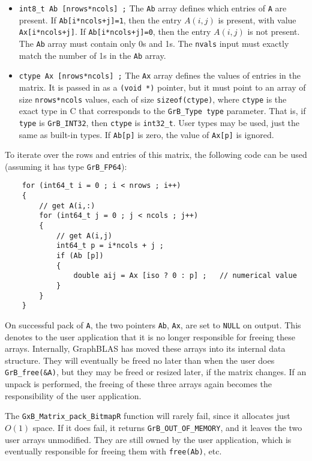 \documentclass[12pt]{article}
\begin{document}
\begin{itemize}
\item \verb'int8_t Ab [nrows*ncols] ;'  The \verb'Ab' array defines which
entries of \verb'A' are present.  If \verb'Ab[i*ncols+j]=1', then the entry
$A(i,j)$ is present, with value \verb'Ax[i*ncols+j]'.  If
\verb'Ab[i*ncols+j]=0', then the entry $A(i,j)$ is not present.  The \verb'Ab'
array must contain only 0s and 1s.  The \verb'nvals' input must exactly match
the number of 1s in the \verb'Ab' array.

\item \verb'ctype Ax [nrows*ncols] ;'  The \verb'Ax' array defines the values
of entries in the matrix.  It is passed in as a \verb'(void *)' pointer, but it
must point to an array of size \verb'nrows*ncols' values, each of size
\verb'sizeof(ctype)', where \verb'ctype' is the exact type in C that
corresponds to the \verb'GrB_Type type' parameter.  That is, if \verb'type' is
\verb'GrB_INT32', then \verb'ctype' is \verb'int32_t'.  User types may be used,
just the same as built-in types.
If \verb'Ab[p]' is zero, the value of \verb'Ax[p]' is ignored.

\end{itemize}

To iterate over the rows and entries of this matrix, the following code can be
used (assuming it has type \verb'GrB_FP64'):

    {\footnotesize
    \begin{verbatim}
    for (int64_t i = 0 ; i < nrows ; i++)
    {
        // get A(i,:)
        for (int64_t j = 0 ; j < ncols ; j++)
        {
            // get A(i,j)
            int64_t p = i*ncols + j ;
            if (Ab [p])
            {
                double aij = Ax [iso ? 0 : p] ;   // numerical value
            }
        }
    } \end{verbatim}}

On successful pack of \verb'A', the two pointers \verb'Ab', \verb'Ax',
are set to \verb'NULL' on output.  This denotes to the user
application that it is no longer responsible for freeing these arrays.
Internally, GraphBLAS has moved these arrays into its internal data structure.
They will eventually be freed no later than when the user does
\verb'GrB_free(&A)', but they may be freed or resized later, if the matrix
changes.  If an unpack is performed, the freeing of these three arrays again
becomes the responsibility of the user application.

The \verb'GxB_Matrix_pack_BitmapR' function will rarely fail, since it allocates
just $O(1)$ space.  If it does fail, it returns \verb'GrB_OUT_OF_MEMORY',
and it leaves the two user arrays unmodified.  They are still owned by
the user application, which is eventually responsible for freeing them with
\verb'free(Ab)', etc.
\end{document}
